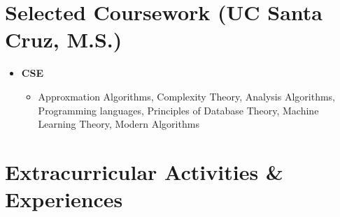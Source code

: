 \documentclass{curriculum-vitae}
\begin{document}
\section{Selected Coursework (UC Santa Cruz, M.S.)}
\begin{itemize}
    \item\textbf{CSE}
    \begin{itemize}
        \item Approxmation Algorithms, Complexity Theory, Analysis Algorithms, Programming languages, Principles of Database Theory, Machine Learning Theory, Modern Algorithms
    \end{itemize}


\end{itemize}


\section{Extracurricular Activities \& Experiences}
\end{document}
